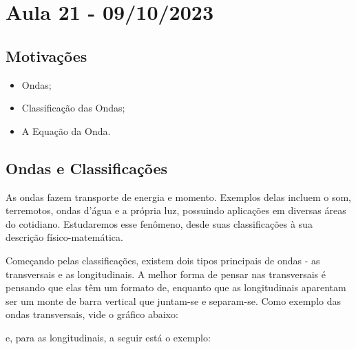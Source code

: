 \documentclass[PhysicsII/physicsII_notes.tex]{subfiles}
\begin{document}
\section{Aula 21 - 09/10/2023}
\subsection{Motivações}
\begin{itemize}
	\item Ondas;
	\item Classificação das Ondas;
	\item A Equação da Onda.
\end{itemize}
\subsection{Ondas e Classificações}
As ondas fazem transporte de energia e momento. Exemplos delas incluem o som, terremotos,
ondas d'água e a própria luz, possuindo aplicações em diversas áreas do cotidiano. Estudaremos
esse fenômeno, desde suas classificações à sua descrição físico-matemática.

Começando pelas classificações, existem dois tipos principais de ondas - as transversais e as longitudinais.
A melhor forma de pensar nas transversais é pensando que elas têm um formato de, enquanto que as longitudinais
aparentam ser um monte de barra vertical que juntam-se e separam-se. Como exemplo
das ondas transversais, vide o gráfico abaixo:

\begin{center}
\end{center}

e, para as longitudinais, a seguir está o exemplo:

\begin{center}
\end{center}
\end{document}
